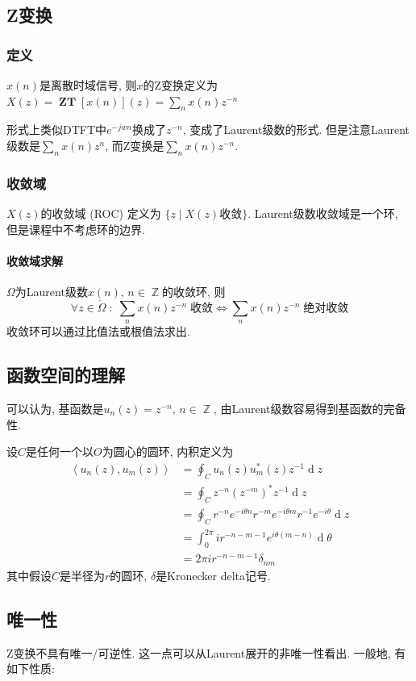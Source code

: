 \documentclass{ctexart}
\DeclareMathOperator{\ZT}{\mathbf{ZT}}
\DeclareMathOperator{\ud}{\mathrm{d}}
\DeclareMathOperator{\Zset}{\mathbb{Z}}
\begin{document}
\subsection{Z变换}
\subsubsection{定义} $x(n)$是离散时域信号,
    则$x$的Z变换定义为$X(z) = \ZT[x(n)](z) = \sum_n x(n) z^{-n}$\par
    形式上类似DTFT中$e^{-jwn}$换成了$z^{-n}$, 变成了Laurent级数的形式.
    但是注意Laurent级数是$\sum_n x (n) z^n$, 而Z变换是$\sum_n x (n) z^{-n}$.
\subsubsection{收敛域} $X(z)$的收敛域 (ROC) 定义为 $\{z \;|\; X(z)\text{收敛}\}$.
    Laurent级数收敛域是一个环, 但是课程中不考虑环的边界.
\paragraph{收敛域求解} $\Omega$为Laurent级数$x(n),\,n\in\Zset$的收敛环, 则
    \[\forall z \in \mathring{\Omega}\;:\;
        \sum_n x(n)z^{-n}\;\text{收敛} \Leftrightarrow
        \sum_n x(n)z^{-n}\;\text{绝对收敛} \]
    收敛环可以通过比值法或根值法求出.
\subsection{函数空间的理解}
    可以认为, 基函数是$u_n(z) = z^{-n},\,n \in \Zset$, 由Laurent级数容易得到基函数的完备性.\par
    设$C$是任何一个以$O$为圆心的圆环, 内积定义为\begin{align*}
        \left\langle u_n(z), u_m(z) \right\rangle &= \oint_C u_n(z) u_m^*(z) z^{-1} \ud z\\
            &= \oint_C z^{-n} (z^{-m})^* z^{-1} \ud z\\
            &= \oint_C r^{-n} e^{-i \theta n} r^{-m} e^{-i \theta m} r^{-1} e^{-i \theta} \ud z\\
            &= \int_0^{2\pi} i r^{-n-m-1} e^{i \theta (m - n)} \ud \theta\\
        &= 2 \pi i r^{-n-m-1} \delta_{nm}\end{align*}
    其中假设$C$是半径为$r$的圆环, $\delta$是Kronecker delta记号.
\subsection{唯一性}
    Z变换不具有唯一/可逆性. 这一点可以从Laurent展开的非唯一性看出.
    一般地, 有如下性质:
\end{document}

